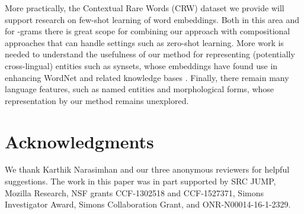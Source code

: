 \documentclass[11pt,a4paper]{article}
\begin{document}
More practically, the Contextual Rare Words (CRW) dataset we provide will support research on few-shot learning of word embeddings.
Both in this area and for -grams there is great scope for combining our approach with compositional approaches \cite{Bojanowski:16,Poliak:17} that can handle settings such as zero-shot learning.
More work is needed to understand the usefulness of our method for representing (potentially cross-lingual) entities such as synsets, whose embeddings have found use in enhancing WordNet and related knowledge bases \cite{Camacho:16,Khodak:17}.
Finally, there remain many language features, such as named entities and morphological forms, whose representation by our method remains unexplored.

\section*{Acknowledgments}
We thank Karthik Narasimhan and our three anonymous reviewers for helpful suggestions.
The work in this paper was in part supported by SRC JUMP, Mozilla Research, NSF grants CCF-1302518 and CCF-1527371, Simons Investigator Award, Simons Collaboration Grant, and ONR-N00014-16-1-2329.



\end{document}
